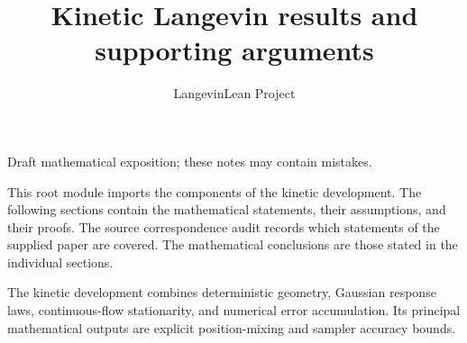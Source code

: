 \documentclass[11pt,a4paper]{article}
\title{\texorpdfstring{Kinetic Langevin results and supporting arguments}{Kinetic Langevin results and supporting arguments}}
\author{LangevinLean Project}
\date{}
\begin{document}
\maketitle
Draft mathematical exposition; these notes may contain mistakes.


This root module imports the components of the kinetic development. The following sections contain the mathematical statements, their assumptions, and their proofs. The source correspondence audit records which statements of the supplied paper are covered. The mathematical conclusions are those stated in the individual sections.



The kinetic development combines deterministic geometry, Gaussian response laws, continuous-flow stationarity, and numerical error accumulation. Its principal mathematical outputs are explicit position-mixing and sampler accuracy bounds.
\end{document}

